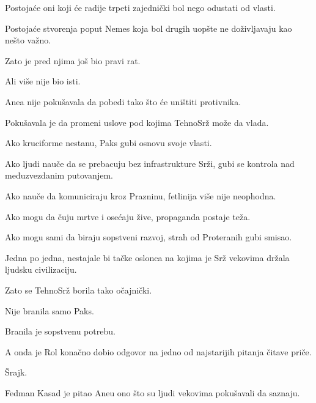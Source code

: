 Postojaće oni koji će radije trpeti zajednički bol nego odustati od vlasti.

\bigskip

Postojaće stvorenja poput Nemes koja bol drugih uopšte ne doživljavaju kao nešto važno.

\bigskip

Zato je pred njima još bio pravi rat.

\bigskip

Ali više nije bio isti.

\bigskip

Anea nije pokušavala da pobedi tako što će uništiti protivnika.

\bigskip

Pokušavala je da promeni uslove pod kojima TehnoSrž može da vlada.

\bigskip

Ako kruciforme nestanu, Paks gubi osnovu svoje vlasti.

\bigskip

Ako ljudi nauče da se prebacuju bez infrastrukture Srži, gubi se kontrola nad međuzvezdanim putovanjem.

\bigskip

Ako nauče da komuniciraju kroz Prazninu, fetlinija više nije neophodna.

\bigskip

Ako mogu da čuju mrtve i osećaju žive, propaganda postaje teža.

\bigskip

Ako mogu sami da biraju sopstveni razvoj, strah od Proteranih gubi smisao.

\bigskip

Jedna po jedna, nestajale bi tačke oslonca na kojima je Srž vekovima držala ljudsku civilizaciju.

\bigskip

Zato se TehnoSrž borila tako očajnički.

\bigskip

Nije branila samo Paks.

\bigskip

Branila je sopstvenu potrebu.

\bigskip

A onda je Rol konačno dobio odgovor na jedno od najstarijih pitanja čitave priče.

\bigskip

Šrajk.

\bigskip

Fedman Kasad je pitao Aneu ono što su ljudi vekovima pokušavali da saznaju.

